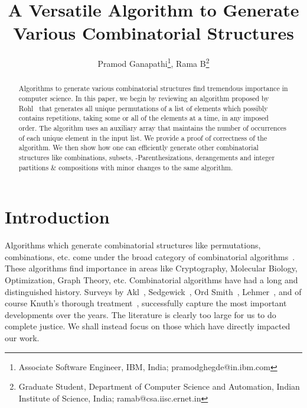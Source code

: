 \documentclass{article}
\title{A Versatile Algorithm to Generate Various Combinatorial Structures}
\author{Pramod Ganapathi\thanks{Associate Software Engineer, IBM, India; pramodghegde@in.ibm.com}, Rama B\thanks{Graduate Student, Department of Computer Science and Automation, Indian Institute of Science, India; ramab@csa.iisc.ernet.in}}
\begin{document}
\thispagestyle{empty}

\label{firstpage}
\maketitle 
\begin{abstract}
Algorithms to generate various combinatorial structures find tremendous importance in computer science. In this paper, we begin by reviewing an algorithm proposed by Rohl~\cite{rohl1} that generates all unique permutations of a list of elements which possibly contains repetitions, taking some or all of the elements at a time, in any imposed order. The algorithm uses an auxiliary array that maintains the number of occurrences of each unique element in the input list. We provide a proof of correctness of the algorithm. We then show how one can efficiently generate other combinatorial structures like combinations, subsets, -Parenthesizations, derangements and integer partitions \& compositions with minor changes to the same algorithm.
\end{abstract}


\section{Introduction}
\label{sec:intro}

Algorithms which generate combinatorial structures like permutations, combinations, etc. come under the broad category of combinatorial algorithms~\cite{book_KrSt}. These algorithms find importance in areas like Cryptography, Molecular Biology, Optimization, Graph Theory, etc. Combinatorial algorithms have had a long and distinguished history. Surveys by Akl~\cite{selim_combsurvey}, Sedgewick~\cite{sedgewick_perm}, Ord Smith~\cite{ordsmith_1,ordsmith_2}, Lehmer~\cite{lehmer_tricks}, and of course Knuth's thorough treatment~\cite{knuth_perm,knuth_fas3}, successfully capture the most important developments over the years. The literature is clearly too large for us to do complete justice. We shall instead focus on those which have directly impacted our work.
\end{document}
